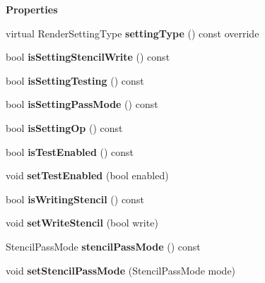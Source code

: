 \begin{Indent}\textbf{ Properties}\par
\begin{DoxyCompactItemize}
\item 
\mbox{\label{classrev_1_1_stencil_setting_aa52a291b284c993f30f59884a82dc81a}} 
virtual Render\+Setting\+Type {\bfseries setting\+Type} () const override
\item 
\mbox{\label{classrev_1_1_stencil_setting_a2a94580eca9efea06841a4f7ee065bfd}} 
bool {\bfseries is\+Setting\+Stencil\+Write} () const
\item 
\mbox{\label{classrev_1_1_stencil_setting_a18479a282e3499b1b8e4d2f60fd5cdfd}} 
bool {\bfseries is\+Setting\+Testing} () const
\item 
\mbox{\label{classrev_1_1_stencil_setting_a4070e9135c53e13f4dd90a7d7040cb5c}} 
bool {\bfseries is\+Setting\+Pass\+Mode} () const
\item 
\mbox{\label{classrev_1_1_stencil_setting_a3a98bb16ded3b437e2303f01d4accd6d}} 
bool {\bfseries is\+Setting\+Op} () const
\item 
\mbox{\label{classrev_1_1_stencil_setting_acda654a06d6b4e5c1a47d56222d57e97}} 
bool {\bfseries is\+Test\+Enabled} () const
\item 
\mbox{\label{classrev_1_1_stencil_setting_a2c82c166db7d5b873eb1b893d268012b}} 
void {\bfseries set\+Test\+Enabled} (bool enabled)
\item 
\mbox{\label{classrev_1_1_stencil_setting_ac2c73cfdef1a5f5a06f8ae69b216b251}} 
bool {\bfseries is\+Writing\+Stencil} () const
\item 
\mbox{\label{classrev_1_1_stencil_setting_a5eba9baf70ecaea9f6527d4826c0193e}} 
void {\bfseries set\+Write\+Stencil} (bool write)
\item 
\mbox{\label{classrev_1_1_stencil_setting_a606ea2e547b5315fc23ac0f66bd3350d}} 
Stencil\+Pass\+Mode {\bfseries stencil\+Pass\+Mode} () const
\item 
\mbox{\label{classrev_1_1_stencil_setting_a7ab4993e8f1ab70bf9b15b6640403485}} 
void {\bfseries set\+Stencil\+Pass\+Mode} (Stencil\+Pass\+Mode mode)
\end{DoxyCompactItemize}
\end{Indent}
